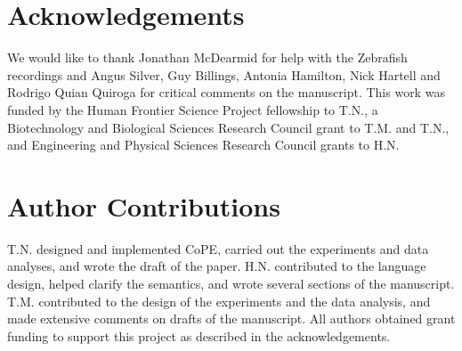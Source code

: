 \section*{Acknowledgements} 

We would like to thank Jonathan McDearmid for help with the Zebrafish
recordings and Angus Silver, Guy Billings, Antonia Hamilton, Nick
Hartell and Rodrigo Quian Quiroga for critical comments on the
manuscript. This work was funded by the Human Frontier Science Project
fellowship to T.N., a Biotechnology and Biological Sciences Research
Council grant to T.M. and T.N., and Engineering and Physical Sciences Research
Council grants to H.N.

\section*{Author Contributions}  
T.N. designed and implemented CoPE, carried out the experiments and
data analyses, and wrote the draft of the paper. H.N. contributed to
the language design, helped clarify the semantics, and wrote several
sections of the manuscript. T.M. contributed to the design of the
experiments and the data analysis, and made extensive comments on
drafts of the manuscript. All authors obtained grant funding to
support this project as described in the acknowledgements.



